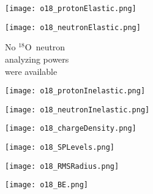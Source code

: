\documentclass[twocolumn,secnumarabic,amssymb, nobibnotes, aps, prl,
superscriptaddress, nobalancelastpage, floatfix]{revtex4}
\newcommand{\oEight}{\ensuremath{^{18}}O}
\begin{document}
{\begin{figure*}[!htb]
    \centering
    \begin{minipage}{0.4\linewidth}
        \centering
        \texttt{[image: o18\_protonElastic.png]}
        \label{DOM_o18_proton_elastic}
    \end{minipage}\hspace{6pt}
    \begin{minipage}{0.4\linewidth}
        \centering
        \vspace{-10pt}
        \begin{minipage}[c]{0.5\linewidth}
            \centering
                \texttt{[image: o18\_neutronElastic.png]}
        \end{minipage}
        \begin{minipage}[c]{0.45\linewidth}
            \centering
            No \oEight\ neutron \\
            analyzing powers\\
            were available
        \end{minipage}
        \label{DOM_o18_neutron_elastic}
    \end{minipage}
    \centering
    \begin{minipage}{0.4\linewidth}
        \centering
        \texttt{[image: o18\_protonInelastic.png]}
        \label{DOM_o18_proton_inelastic}
    \end{minipage}\hspace{6pt}
    \begin{minipage}{0.4\linewidth}
        \centering
        \texttt{[image: o18\_neutronInelastic.png]}
        \label{DOM_o18_neutron_inelastic}
    \end{minipage}
    \centering
    \begin{minipage}{0.4\linewidth}
        \centering
        \texttt{[image: o18\_chargeDensity.png]}
        \label{DOM_o18_chargeDensity}
    \end{minipage}\hspace{6pt}
    \begin{minipage}{0.4\linewidth}
        \centering
        \texttt{[image: o18\_SPLevels.png]}
        \label{DOM_o18_SPLevels}
    \end{minipage}
    \begin{minipage}{0.4\linewidth}
        \centering
        \texttt{[image: o18\_RMSRadius.png]}
        \label{DOM_o18_RMSRadius}
    \end{minipage}\hspace{6pt}
    \begin{minipage}{0.4\linewidth}
        \centering
        \texttt{[image: o18\_BE.png]}
        \label{DOM_o18_BE}
    \end{minipage}
    \caption{\oEight: constraining experimental data and DOM fit. See introduction of
    Appendix C for description.}
    \label{DOM_o18}
\end{figure*}

}
\end{document}
